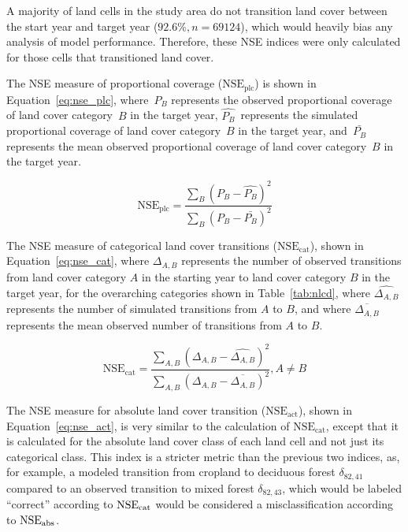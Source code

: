 A majority of land cells in the study area do not transition land cover
between the start year and target year ($92.6\%, n=69124$),
which would heavily bias any analysis of model performance.
Therefore, these NSE indices were only calculated for those cells
that transitioned land cover.

The NSE measure of proportional coverage ($\text{NSE}_\text{plc}$)
is shown in Equation~\ref{eq:nse_plc},
where~$P_B$ represents the observed proportional coverage of land cover
category~$B$ in the target year,
$\hat{P_B}$~represents the simulated proportional coverage of land cover
category~$B$ in the target year,
and~$\bar{P_B}$ represents the mean observed proportional coverage of
land cover category~$B$ in the target year.

\begin{equation}
    \label{eq:nse_plc}
    \text{NSE}_{\text{plc}} 
    = \frac{\sum_B\left(P_B - \hat{P_B}\right)^2}
        {\sum_B\left(P_B-\bar{P_B}\right)^2}
\end{equation}

The NSE measure of categorical land cover transitions 
($\text{NSE}_\text{cat}$), shown in Equation~\ref{eq:nse_cat},
where $\Delta_{A,B}$ represents the number of observed transitions
from land cover category $A$ in the starting year to land cover
category $B$ in the target year,
for the overarching categories shown in Table~\ref{tab:nlcd},
where $\widehat{\Delta_{A,B}}$ represents 
the number of simulated transitions from $A$ to $B$,
and where $\overline{\Delta_{A,B}}$ represents the mean observed number of
transitions from $A$ to $B$.

\begin{equation}
    \label{eq:nse_cat}
    \text{NSE}_{\text{cat}}
    = \frac{\sum_{A,B}\left(\Delta_{A,B}-\widehat{\Delta_{A,B}}\right)^2}
        {\sum_{A,B}\left(\Delta_{A,B}-\overline{\Delta_{A,B}}\right)^2},
    A \ne B
\end{equation}

The NSE measure for absolute land cover transition 
($\text{NSE}_\text{act}$), shown in Equation~\ref{eq:nse_act},
is very similar to the calculation of $\text{NSE}_\text{cat}$,
except that it is calculated for the absolute land cover class of each
land cell and not just its categorical class.
This index is a stricter metric than the previous two indices,
as, for example,
a modeled transition from cropland to deciduous forest $\delta_{82,41}$
compared to an observed transition to mixed forest $\delta_{82,43}$,
which would be labeled ``correct'' according to $\text{NSE}_{\text{cat}}$
would be considered a misclassification according to $\text{NSE}_{\text{abs}}$.

